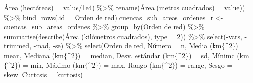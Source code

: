 \documentclass[spanish]{article}
\newenvironment{Shaded}{\begin{snugshade}}{\end{snugshade}}
\newcommand{\AttributeTok}[1]{\textcolor[rgb]{0.77,0.63,0.00}{#1}}
\newcommand{\DecValTok}[1]{\textcolor[rgb]{0.00,0.00,0.81}{#1}}
\newcommand{\FloatTok}[1]{\textcolor[rgb]{0.00,0.00,0.81}{#1}}
\newcommand{\FunctionTok}[1]{\textcolor[rgb]{0.00,0.00,0.00}{#1}}
\newcommand{\NormalTok}[1]{#1}
\newcommand{\OtherTok}[1]{\textcolor[rgb]{0.56,0.35,0.01}{#1}}
\newcommand{\SpecialCharTok}[1]{\textcolor[rgb]{0.00,0.00,0.00}{#1}}
\newcommand{\StringTok}[1]{\textcolor[rgb]{0.31,0.60,0.02}{#1}}
\begin{document}
\begin{Shaded}
\begin{Highlighting}[]
                                  \StringTok{\textasciigrave{}}\AttributeTok{Área (hectáreas)}\StringTok{\textasciigrave{}} \OtherTok{=}\NormalTok{ value}\SpecialCharTok{/}\FloatTok{1e4}\NormalTok{) }\SpecialCharTok{\%\textgreater{}\%} 
                           \FunctionTok{rename}\NormalTok{(}\StringTok{\textasciigrave{}}\AttributeTok{Área (metros cuadrados)}\StringTok{\textasciigrave{}} \OtherTok{=}\NormalTok{ value)) }\SpecialCharTok{\%\textgreater{}\%} 
  \FunctionTok{bind\_rows}\NormalTok{(}\AttributeTok{.id =} \StringTok{\textquotesingle{}Orden de red\textquotesingle{}}\NormalTok{)}
\NormalTok{cuencas\_sub\_areas\_ordenes\_r }\OtherTok{\textless{}{-}}\NormalTok{ cuencas\_sub\_areas\_ordenes }\SpecialCharTok{\%\textgreater{}\%}
  \FunctionTok{group\_by}\NormalTok{(}\StringTok{\textasciigrave{}}\AttributeTok{Orden de red}\StringTok{\textasciigrave{}}\NormalTok{) }\SpecialCharTok{\%\textgreater{}\%} 
  \FunctionTok{summarise}\NormalTok{(}\FunctionTok{describe}\NormalTok{(}\StringTok{\textasciigrave{}}\AttributeTok{Área (kilómetros cuadrados)}\StringTok{\textasciigrave{}}\NormalTok{, }\AttributeTok{type =} \DecValTok{2}\NormalTok{)) }\SpecialCharTok{\%\textgreater{}\%} 
  \FunctionTok{select}\NormalTok{(}\SpecialCharTok{{-}}\StringTok{\textasciigrave{}}\AttributeTok{vars}\StringTok{\textasciigrave{}}\NormalTok{, }\SpecialCharTok{{-}}\NormalTok{trimmed, }\SpecialCharTok{{-}}\NormalTok{mad, }\SpecialCharTok{{-}}\NormalTok{se) }\SpecialCharTok{\%\textgreater{}\%}
  \FunctionTok{select}\NormalTok{(}\StringTok{\textasciigrave{}}\AttributeTok{Orden de red}\StringTok{\textasciigrave{}}\NormalTok{, }\StringTok{\textasciigrave{}}\AttributeTok{Número}\StringTok{\textasciigrave{}} \OtherTok{=}\NormalTok{ n, }\StringTok{\textasciigrave{}}\AttributeTok{Media (km$\{\^{}2\}$)}\StringTok{\textasciigrave{}} \OtherTok{=}\NormalTok{ mean,}
         \StringTok{\textasciigrave{}}\AttributeTok{Mediana (km$\{\^{}2\}$)}\StringTok{\textasciigrave{}} \OtherTok{=}\NormalTok{ median, }\StringTok{\textasciigrave{}}\AttributeTok{Desv. estándar (km$\{\^{}2\}$)}\StringTok{\textasciigrave{}} \OtherTok{=}\NormalTok{ sd,}
         \StringTok{\textasciigrave{}}\AttributeTok{Mínimo (km$\{\^{}2\}$)}\StringTok{\textasciigrave{}} \OtherTok{=}\NormalTok{ min, }\StringTok{\textasciigrave{}}\AttributeTok{Máximo (km$\{\^{}2\}$)}\StringTok{\textasciigrave{}} \OtherTok{=}\NormalTok{ max,}
         \StringTok{\textasciigrave{}}\AttributeTok{Rango (km$\{\^{}2\}$)}\StringTok{\textasciigrave{}} \OtherTok{=}\NormalTok{ range, }\AttributeTok{Sesgo =}\NormalTok{ skew,}
         \AttributeTok{Curtosis =}\NormalTok{ kurtosis)}

\end{Highlighting}
\end{Shaded}
\end{document}
